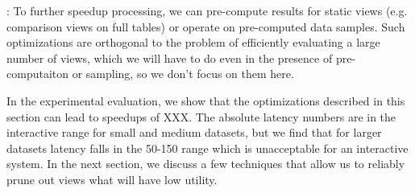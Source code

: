   

: 
To further speedup processing, we can pre-compute results for 
static views (e.g. comparison views on full tables) or operate on
pre-computed data samples.  Such optimizations are orthogonal to the
problem of efficiently evaluating a large number of views, which we will have to
do even in the presence of pre-computaiton or sampling, so we don't focus on them here.

In the experimental evaluation, we show that the optimizations described in this section can lead to speedups of XXX.
The absolute latency numbers are in the interactive range for small and medium datasets, but we find that for larger datasets latency falls in the 50-150 range which is unacceptable for an interactive system.
In the next section, we discuss a few techniques that allow us to reliably prune out  views what will have low utility. 

